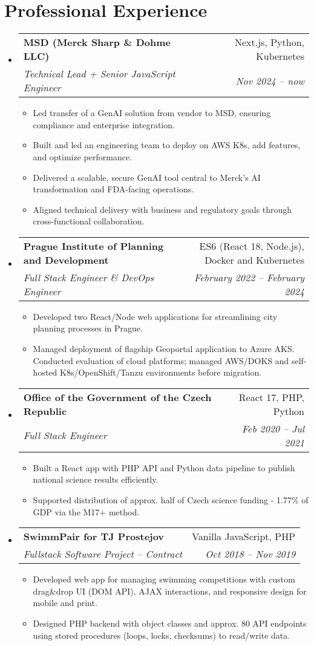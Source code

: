 \documentclass[letterpaper,11pt]{article}
\makeatletter
\newcommand{\sitem}[1]{\item #1 \vspace{-2pt}}
\newcommand{\resumeSubheading}[4]{
  \vspace{-1pt}\item
    \begin{tabular*}{0.97\textwidth}[t]{l@{\extracolsep{\fill}}r}
      \textbf{#1} & #2 \\
      \textit{\small#3} & \textit{\small #4} \\
    \end{tabular*}\vspace{-5pt}
}
\newenvironment{subheadingListing}{\begin{itemize}[leftmargin=*]}{\end{itemize}}
\newenvironment{resumeList}{\begin{itemize}}{\end{itemize}\vspace{-5pt}}
\makeatother
\begin{document}
\section{Professional Experience}
\begin{subheadingListing}
  \resumeSubheading
  {MSD (Merck Sharp \& Dohme LLC)}{Next.js, Python, Kubernetes}
  { Technical Lead + Senior JavaScript Engineer}{Nov 2024 – now}
  \begin{resumeList}
    \sitem{Led transfer of a GenAI solution from vendor to MSD, ensuring compliance and enterprise integration.}
    \sitem{Built and led an engineering team to deploy on AWS K8s, add features, and optimize performance.}
    \sitem{Delivered a scalable, secure GenAI tool central to Merck’s AI transformation and FDA-facing operations.}
    \sitem{Aligned technical delivery with business and regulatory goals through cross-functional collaboration.}
  \end{resumeList}

  \resumeSubheading
  {Prague Institute of Planning and Development}{ES6 (React 18, Node.js), Docker and Kubernetes}
  {Full Stack Engineer \& DevOps Engineer}{February 2022 – February 2024}
  \begin{resumeList}
    \sitem{Developed two React/Node web applications for streamlining city planning processes in Prague.}
    \sitem{Managed deployment of flagship Geoportal application to Azure AKS. Conducted evaluation of cloud platforms; managed AWS/DOKS and self-hosted K8s/OpenShift/Tanzu environments before migration.}
  \end{resumeList}

  \resumeSubheading
    {Office of the Government of the Czech Republic}{React 17, PHP, Python}
    {Full Stack Engineer}{Feb 2020 – Jul 2021}
    \begin{resumeList}
      \sitem{Built a React app with PHP API and Python data pipeline to publish national science results efficiently.}
      \sitem{Supported distribution of approx. half of Czech science funding - 1.77\% of GDP via the M17+ method.}
    \end{resumeList}

\resumeSubheading
{SwimmPair for TJ Prostejov}{Vanilla JavaScript, PHP}
{Fullstack Software Project – Contract}{Oct 2018 – Nov 2019}
\begin{resumeList}
  \sitem{Developed web app for managing swimming competitions with custom drag\&drop UI (DOM API), AJAX interactions, and responsive design for mobile and print.}
  \sitem{Designed PHP backend with object classes and approx. 80 API endpoints using stored procedures (loops, locks, checksums) to read/write data.}
\end{resumeList}



\end{subheadingListing}
\end{document}
